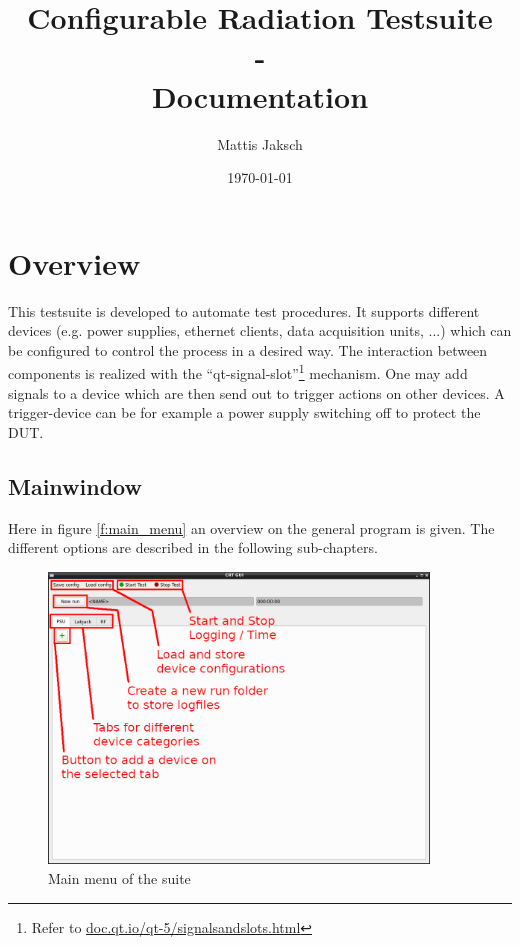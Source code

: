 \documentclass[10pt,a4paper]{article}
\title{Configurable Radiation Testsuite \\- \\Documentation}
\author{Mattis Jaksch}
\date{\today}
\begin{document}
\maketitle

\tableofcontents

\flushleft

\newpage

\section{Overview}
This testsuite is developed to automate test procedures. It supports different devices (e.g. power supplies, ethernet clients, data acquisition units, ...) which can be configured to control the process in a desired way. The interaction between components is realized with the \enquote{qt-signal-slot}\footnote{Refer to \url{doc.qt.io/qt-5/signalsandslots.html}} mechanism. One may add signals to a device which are then send out to trigger actions on other devices. A trigger-device can be for example a power supply switching off to protect the DUT.

	\subsection{Mainwindow}
	Here in figure \eqref{f:main_menu} an overview on the general program is given. The different options are described in the following sub-chapters.
	
	\begin{figure}[H]
\centering
\includegraphics[width=0.9\textwidth]{./1_Plain_Expl.png}
\caption{Main menu of the suite}
\label{f:main_menu}
	\end{figure}
	
\end{document}

